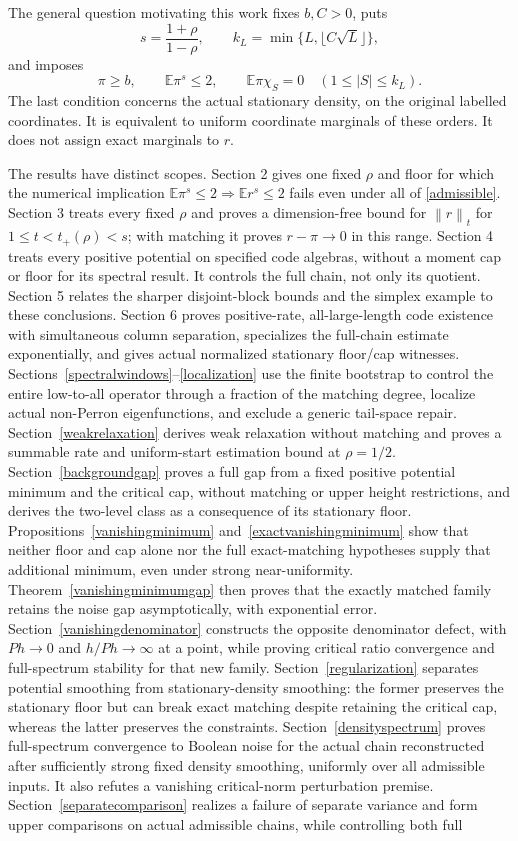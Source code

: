 \documentclass[11pt]{article}
\newcommand{\E}{\mathbb E}
\newcommand{\norm}[1]{\left\|#1\right\|}
\begin{document}
The general question motivating this work fixes $b,C>0$, puts
\[
 s=\frac{1+\rho}{1-\rho},\qquad k_L=\min\{L,\lfloor C\sqrt L\rfloor\},
\]
and imposes
\begin{equation}\label{admissible}
 \pi\geq b,\qquad \E\pi^s\leq2,\qquad
 \E\pi\chi_S=0\quad(1\leq |S|\leq k_L).
\end{equation}
The last condition concerns the actual stationary density, on the original labelled coordinates. It is equivalent to uniform coordinate marginals of these orders. It does not assign exact marginals to $r$.

The results have distinct scopes. Section 2 gives one fixed $\rho$ and floor for which the numerical implication $\E\pi^s\leq2\Rightarrow\E r^s\leq2$ fails even under all of \eqref{admissible}. Section 3 treats every fixed $\rho$ and proves a dimension-free bound for $\norm r_t$ for $1\leq t<t_+(\rho)<s$; with matching it proves $r-\pi\to0$ in this range. Section 4 treats every positive potential on specified code algebras, without a moment cap or floor for its spectral result. It controls the full chain, not only its quotient. Section 5 relates the sharper disjoint-block bounds and the simplex example to these conclusions. Section 6 proves positive-rate, all-large-length code existence with simultaneous column separation, specializes the full-chain estimate exponentially, and gives actual normalized stationary floor/cap witnesses. Sections~\ref{spectralwindows}--\ref{localization} use the finite bootstrap to control the entire low-to-all operator through a fraction of the matching degree, localize actual non-Perron eigenfunctions, and exclude a generic tail-space repair. Section~\ref{weakrelaxation} derives weak relaxation without matching and proves a summable rate and uniform-start estimation bound at $\rho=1/2$. Section~\ref{backgroundgap} proves a full gap from a fixed positive potential minimum and the critical cap, without matching or upper height restrictions, and derives the two-level class as a consequence of its stationary floor. Propositions~\ref{vanishingminimum} and~\ref{exactvanishingminimum} show that neither floor and cap alone nor the full exact-matching hypotheses supply that additional minimum, even under strong near-uniformity. Theorem~\ref{vanishingminimumgap} then proves that the exactly matched family retains the noise gap asymptotically, with exponential error. Section~\ref{vanishingdenominator} constructs the opposite denominator defect, with $Ph\to0$ and $h/Ph\to\infty$ at a point, while proving critical ratio convergence and full-spectrum stability for that new family. Section~\ref{regularization} separates potential smoothing from stationary-density smoothing: the former preserves the stationary floor but can break exact matching despite retaining the critical cap, whereas the latter preserves the constraints. Section~\ref{densityspectrum} proves full-spectrum convergence to Boolean noise for the actual chain reconstructed after sufficiently strong fixed density smoothing, uniformly over all admissible inputs. It also refutes a vanishing critical-norm perturbation premise. Section~\ref{separatecomparison} realizes a failure of separate variance and form upper comparisons on actual admissible chains, while controlling both full 
\end{document}
